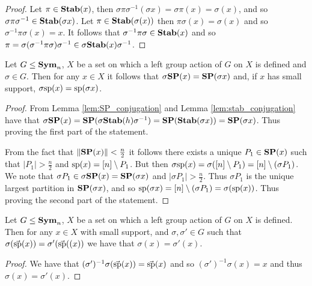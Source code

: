\documentclass[../paper.tex]{subfiles}
\begin{document}
\begin{proof}
  Let $\pi \in \text{\textbf{Stab}}(x)$, then $\sigma \pi \sigma^{-1}(\sigma x) = \sigma \pi
  (x) = \sigma (x)$, and so $\sigma \pi \sigma^{-1} \in \text{\textbf{Stab}}(\sigma x)$. Let
  $\pi \in \text{\textbf{Stab}}(\sigma (x))$ then $\pi \sigma (x) = \sigma (x)$ and so
  $\sigma^{-1} \pi \sigma (x) = x$. It follows that $\sigma^{-1} \pi \sigma \in
  \text{\textbf{Stab}}(x)$ and so $\pi = \sigma (\sigma^{-1} \pi \sigma) \sigma ^{-1} \in
  \sigma \text{\textbf{Stab}}(x) \sigma^{-1}$.
\end{proof}

\begin{lem}
  \label{lem:support_mapping}
  Let $G \leq \text{\textbf{Sym}}_n$, $X$ be a set on which a left group action of $G$ on $X$
  is defined and $\sigma \in G$. Then for any $x \in X$ it follows that $\sigma
  \text{\textbf{SP}} (x) = \text{\textbf{SP}} (\sigma x)$ and, if $x$ has small support, $\sigma \text{sp} (x) =
  \text{sp} (\sigma x)$.
\end{lem}
\begin{proof}
  From Lemma \ref{lem:SP_conjugation} and Lemma \ref{lem:stab_conjugation} have
  that $\sigma \text{\textbf{SP}} (x) = \text{\textbf{SP}}(\sigma \text{\textbf{Stab}}(h) \sigma^{-1}) = \text{\textbf{SP}} (\text{\textbf{Stab}}(\sigma
  x)) = \text{\textbf{SP}} (\sigma x)$. Thus proving the first part of the statement.

  From the fact that $\| \text{\textbf{SP}}(x) \| < \frac{n}{2}$ it follows there exists a
  unique $P_1 \in \text{\textbf{SP}}(x)$ such that $\vert P_1 \vert > \frac{n}{2}$ and
  $\text{sp}(x) = [n] \setminus P_1$. But then $\sigma \text{sp} (x) = \sigma([n]
  \setminus P_1) = [n] \setminus (\sigma P_1)$. We note that $\sigma P_1 \in
  \sigma \text{\textbf{SP}} (x) = \text{\textbf{SP}}(\sigma x)$ and $\vert \sigma P_1 \vert > \frac{n}{2}$.
  Thus $\sigma P_1$ is the unique largest partition in $\text{\textbf{SP}}(\sigma x)$, and so
  $\text{sp}(\sigma x) = [n]\setminus (\sigma P_1) = \sigma (\text{sp}(x))$.
  Thus  proving the second part of the statement.
\end{proof}

\begin{lem}
  Let $G \leq \text{\textbf{Sym}}_n$, $X$ be a set on which a left group action of $G$ on $X$
  is defined.  Then for any $x \in X$ with small support, and $\sigma, \sigma'
  \in G$ such that $\sigma (\vec{\text{sp}}(x)) = \sigma' (\vec{\text{sp}}((x))$ we
  have that $\sigma (x) = \sigma'(x)$.
\end{lem}
\begin{proof}
  We have that $(\sigma')^{-1}\sigma(\vec{\text{sp}}(x)) = \vec{\text{sp}}(x)$ and so
  $(\sigma')^{-1} \sigma (x) = x$ and thus $\sigma (x) = \sigma' (x)$.
\end{proof}
\end{document}
